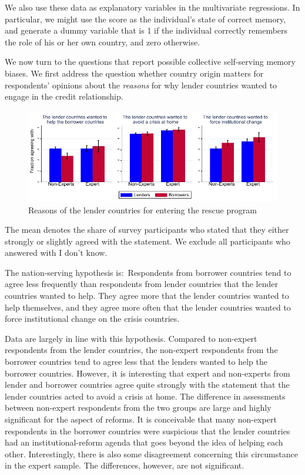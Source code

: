 We also use these data as explanatory variables in the multivariate
regressions. In particular, we might use the score as the
individual's state of correct memory, and generate a dummy variable that is
1 if the individual correctly remembers the role of his or her own country,
and zero otherwise. 

We now turn to the questions that report possible collective
self-serving memory biases. We first address the question whether country
origin matters for respondents' opinions about the \textit{reasons} for why lender countries wanted to engage in the credit relationship. 
\begin{figure}[h!]
\caption{Reasons of the lender countries for entering the rescue program}
    \centering
    \includegraphics[scale=1.2]{graph2.pdf}
  
    \label{fig:my_label}
\end{figure}

The mean denotes the share of survey participants who stated that they either strongly or slightly agreed with the statement. We exclude all participants who answered with I don't know.  

The nation-serving hypothesis is:\ Respondents from borrower countries tend
to agree less frequently than respondents from lender countries 
that the lender countries wanted to help. They agree more that
the lender countries wanted to help themselves, and they agree more 
often that the lender countries wanted to force institutional change on the
crisis countries.\textit{\ }

Data are largely in line with this hypothesis. Compared to
non-expert respondents from the lender countries, the non-expert respondents
from the borrower countries tend to agree less that the
lenders wanted to help the borrower countries. However, it is interesting that expert and non-experts from lender
and borrower countries agree quite strongly with the statement that the lender countries acted to avoid a crisis at home.
The difference in assessments between
non-expert respondents from the two groups are large and highly
significant for the aspect of reforms. It is conceivable that
many non-expert respondents in the borrower countries were suspicious that
the lender countries had an institutional-reform agenda that goes beyond the
idea of helping each other. Interestingly, there is also some disagreement concerning
this circumstance in the expert sample. The differences, however, are not significant. 



